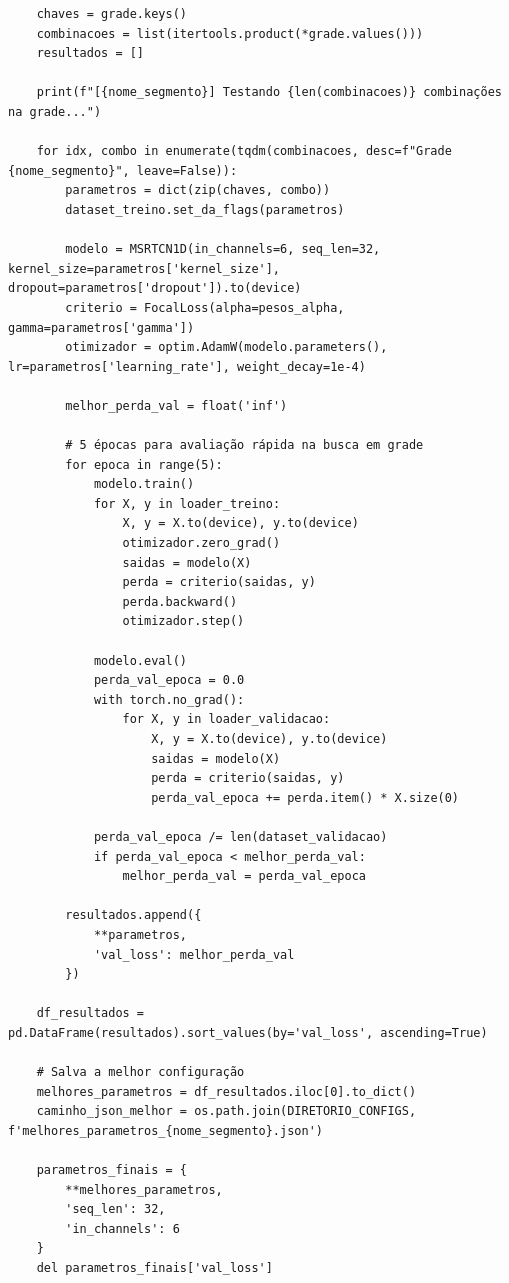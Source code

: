 \documentclass{article}
\begin{document}
\begin{verbatim}
    chaves = grade.keys()
    combinacoes = list(itertools.product(*grade.values()))
    resultados = []
    
    print(f"[{nome_segmento}] Testando {len(combinacoes)} combinações na grade...")
    
    for idx, combo in enumerate(tqdm(combinacoes, desc=f"Grade {nome_segmento}", leave=False)):
        parametros = dict(zip(chaves, combo))
        dataset_treino.set_da_flags(parametros)
        
        modelo = MSRTCN1D(in_channels=6, seq_len=32, kernel_size=parametros['kernel_size'], dropout=parametros['dropout']).to(device)
        criterio = FocalLoss(alpha=pesos_alpha, gamma=parametros['gamma'])
        otimizador = optim.AdamW(modelo.parameters(), lr=parametros['learning_rate'], weight_decay=1e-4)
        
        melhor_perda_val = float('inf')
        
        # 5 épocas para avaliação rápida na busca em grade
        for epoca in range(5):
            modelo.train()
            for X, y in loader_treino:
                X, y = X.to(device), y.to(device)
                otimizador.zero_grad()
                saidas = modelo(X)
                perda = criterio(saidas, y)
                perda.backward()
                otimizador.step()
                
            modelo.eval()
            perda_val_epoca = 0.0
            with torch.no_grad():
                for X, y in loader_validacao:
                    X, y = X.to(device), y.to(device)
                    saidas = modelo(X)
                    perda = criterio(saidas, y)
                    perda_val_epoca += perda.item() * X.size(0)
            
            perda_val_epoca /= len(dataset_validacao)
            if perda_val_epoca < melhor_perda_val: 
                melhor_perda_val = perda_val_epoca
            
        resultados.append({
            **parametros,
            'val_loss': melhor_perda_val 
        })
        
    df_resultados = pd.DataFrame(resultados).sort_values(by='val_loss', ascending=True)
    
    # Salva a melhor configuração
    melhores_parametros = df_resultados.iloc[0].to_dict()
    caminho_json_melhor = os.path.join(DIRETORIO_CONFIGS, f'melhores_parametros_{nome_segmento}.json')
    
    parametros_finais = {
        **melhores_parametros,
        'seq_len': 32,
        'in_channels': 6
    }
    del parametros_finais['val_loss']
    

\end{verbatim}
\end{document}
